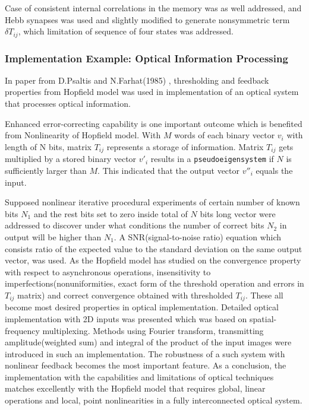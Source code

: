 \documentclass[12pt, a4paper]{article}
\begin{document}
Case of consistent internal correlations in the memory was as well addressed, and Hebb synapses was used and slightly modified to generate nonsymmetric term~$\delta T_{ij}$, which limitation of sequence of four states was addressed.



\subsubsection{Implementation Example: Optical Information Processing}
In paper from D.Psaltis and N.Farhat(1985) \cite{optical_processing}, thresholding and feedback properties from Hopfield model was used in implementation of an optical system that processes optical information.

Enhanced error-correcting capability is one important outcome which is benefited from Nonlinearity of Hopfield model. With $M$ words of each binary vector $v_i$ with length of N bits, matrix $T_{ij}$ represents a storage of information. Matrix $T_{ij}$ gets multiplied by a stored binary vector $v'_i$ results in a \texttt{pseudoeigensystem} if $N$ is sufficiently larger than $M$. This indicated that the output vector $v''_i$ equals the input.

Supposed nonlinear iterative procedural experiments of certain number of known bits $N_1$ and the rest bits set to zero inside total of $N$ bits long vector were addressed to discover under what conditions the number of correct bits $N_2$ in output will be higher than $N_1$. A SNR(signal-to-noise ratio) equation which consists ratio of the expected value to the standard deviation on the same output vector, was used. As the Hopfield model has studied on the convergence property with respect to asynchronous operations, insensitivity to imperfections(nonuniformities, exact form of the threshold operation and errors in $T_{ij}$ matrix) and correct convergence obtained with thresholded $T_{ij}$. These all become most desired properties in optical implementation. Detailed optical implementation with 2D inputs was presented which was based on spatial-frequency multiplexing. Methods using Fourier transform, transmitting amplitude(weighted sum) and integral of the product of the input images were introduced in such an implementation. The robustness of a such system with nonlinear feedback becomes the most important feature.
As a conclusion, the implementation with the capabilities and limitations of optical techniques matches excellently with the Hopfield model that requires global, linear operations and local, point nonlinearities in a fully interconnected optical system.
\end{document}
